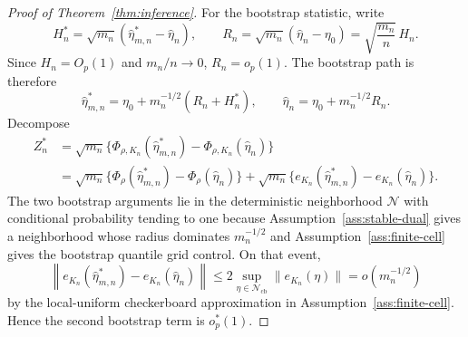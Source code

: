 \begin{proof}[Proof of Theorem~\ref{thm:inference}]
For the bootstrap statistic, write
\[
H_n^*=\sqrt{m_n}(\widehat\eta_{m,n}^*-\widehat\eta_n),
\qquad
R_n=\sqrt{m_n}(\widehat\eta_n-\eta_0)=\sqrt{\frac{m_n}{n}}\,H_n.
\]
Since \(H_n=O_p(1)\) and \(m_n/n\to0\), \(R_n=o_p(1)\).  The bootstrap path is therefore
\[
\widehat\eta_{m,n}^*=\eta_0+m_n^{-1/2}(R_n+H_n^*),
\qquad
\widehat\eta_n=\eta_0+m_n^{-1/2}R_n.
\]
Decompose
\[
\begin{aligned}
Z_n^*
&=\sqrt{m_n}\{\Phi_{\rho,K_n}(\widehat\eta_{m,n}^*)-\Phi_{\rho,K_n}(\widehat\eta_n)\}\\
&=\sqrt{m_n}\{\Phi_\rho(\widehat\eta_{m,n}^*)-\Phi_\rho(\widehat\eta_n)\}
+\sqrt{m_n}\{e_{K_n}(\widehat\eta_{m,n}^*)-e_{K_n}(\widehat\eta_n)\}.
\end{aligned}
\]
The two bootstrap arguments lie in the deterministic neighborhood \(\mathcal N\) with conditional probability tending to one because Assumption~\ref{ass:stable-dual} gives a neighborhood whose radius dominates \(m_n^{-1/2}\) and Assumption~\ref{ass:finite-cell} gives the bootstrap quantile grid control.  On that event,
\[
\left\|e_{K_n}(\widehat\eta_{m,n}^*)-e_{K_n}(\widehat\eta_n)\right\|
\le 2\sup_{\eta\in\mathcal N_{\mathrm{cb}}}\|e_{K_n}(\eta)\|
=o(m_n^{-1/2})
\]
by the local-uniform checkerboard approximation in Assumption~\ref{ass:finite-cell}.  Hence the second bootstrap term is \(o_p^*(1)\).


\end{proof}
